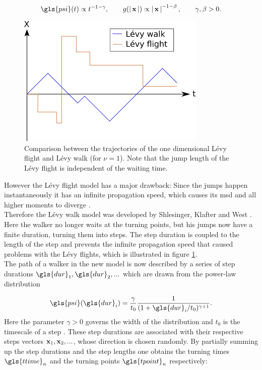 \begin{align}
\gls{psi}(t) \propto t^{-1-\gamma}, \qquad g(\abs{\ve{x}}) \propto \abs{\ve{x}}^{-1-\beta}, \qquad \gamma, \beta > 0.
\end{align} 
%
\begin{figure}
\begin{center}
\includegraphics[width=90mm]{pics/levyFlight.png}
\caption{Comparison between the trajectories of the one dimensional L\'evy flight and L\'evy walk (for $\nu=1$). Note that the jump length of the L\'evy flight is independent of the waiting time. 
\label{fig:levyFlight}}
\end{center}
\end{figure}
%
However the L\'evy flight model has a major drawback: Since the jumps happen instantaneously it has an infinite propagation speed, which causes its \gls{msd} and all higher moments to diverge \cite{lwreview}. \\


Therefore the L\'evy walk model was developed by Shlesinger, Klafter and West \cite{shlesinger1987}. Here the walker no longer waits at the turning points, but his jumps now have a finite duration, turning them into steps. The step duration is coupled to the length of the step and prevents the infinite propagation speed that caused problems with the L\'evy flights, which is illustrated in figure \ref{fig:levyFlight}. \\

The path of a walker in the new model is now described by a series of step durations $\gls{dur}_1, \gls{dur}_2, ...$ which are drawn from the power-law distribution 

\begin{align}
\gls{psi}(\gls{dur}_i) = \frac{\gamma}{t_0} \frac{1}{(1+\gls{dur}_i/t_0)^{\gamma+1}} .
\label{eqn:defPsiT}
\end{align}
%
Here the parameter $\gamma>0$ governs the width of the distribution and { \color{red}$t_0$ is the timescale of a step }. These step durations are associated with their respective steps vectors $\mathbf{ x }_1, \mathbf{ x }_2, ...$, whose direction is chosen randomly. By partially summing up the step durations and the step lengths one obtains the turning times $\gls{ttime}_n$ and the turning points $\gls{tpoint}_n$ respectively:

